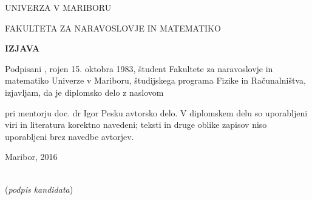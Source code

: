   \newpage

  \begin{center}
    \large
    UNIVERZA V MARIBORU

    FAKULTETA ZA NARAVOSLOVJE IN MATEMATIKO

  \end{center}

  \vspace{2cm}

  \begin{center}
    \Large
    \textbf{IZJAVA}
  \end{center}

  \vspace{2cm}

  Podpisani \kandidat, rojen 15. oktobra 1983, študent
  Fakultete za naravoslovje in matematiko Univerze v Mariboru,
  študijskega programa Fizike in Računalništva, izjavljam, da je
  diplomsko delo z naslovom
  \begin{center}
    \textbf{\podnaslov}
  \end{center}
  pri mentorju doc. dr Igor Pesku avtorsko delo. V diplomskem delu so
  uporabljeni viri in literatura korektno navedeni; teksti in druge
  oblike zapisov niso uporabljeni brez navedbe avtorjev.

  \vspace{3cm}
  
  Maribor, 2016
  
  \vspace{1cm}  
  \hfill
  \begin{minipage}[t]{0.3\textwidth}
    \kandidat\\
     (\emph{podpis kandidata})
  \end{minipage}
  



